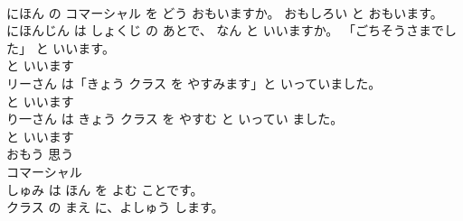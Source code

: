 \documentclass[8pt]{extreport}
\begin{document}
\begin{CJK}{UTF8}{min}
\\	にほん の コマーシャル を どう おもいますか。 おもしろい と おもいます。	
\\	にほんじん は しょくじ の あとで、 なん と いいますか。 「ごちそうさまでした」 と いいます。	
\\	と いいます
\\	リーさん は「きょう クラス を やすみます」と いっていました。	
\\	と いいます
\\	り一さん は きょう クラス を やすむ と いってい ました。	
\\	と いいます
\\	おもう	思う
\\	コマーシャル	
\\	しゅみ は ほん を よむ ことです。	
\\	クラス の まえ に、よしゅう します。	
\end{CJK}
\end{document}
